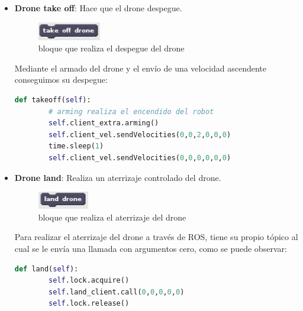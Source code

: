 \begin{itemize}
\begin{itemize}
\begin{lstlisting}[language=python,firstnumber=1]
\end{lstlisting}

	\item \textbf{Drone take off}: Hace que el drone despegue.\\
	\begin{figure}[H]
     		\centering
     		\includegraphics[scale=1.2]{img/block-takeoff.png}
     		\caption{bloque que realiza el despegue del drone}
  		\label{fig:listas}
  				\end{figure}
  				
Mediante el armado del drone y el envío de una velocidad ascendente conseguimos su despegue:\\

 \begin{lstlisting}[language=python,firstnumber=1]
    def takeoff(self):
    	# arming realiza el encendido del robot
        self.client_extra.arming()
        self.client_vel.sendVelocities(0,0,2,0,0,0)
        time.sleep(1)
        self.client_vel.sendVelocities(0,0,0,0,0,0)
\end{lstlisting}

	\item \textbf{Drone land}: Realiza un aterrizaje controlado del drone.\\
	\begin{figure}[H]
     		\centering
     		\includegraphics[scale=1.2]{img/block-land.png}
     		\caption{bloque que realiza el aterrizaje del drone}
  		\label{fig:listas}
  				\end{figure}
Para realizar el aterrizaje del drone a través de ROS, tiene su propio tópico al cual se le envía una llamada con argumentos cero, como se puede observar:\\

 \begin{lstlisting}[language=python,firstnumber=1]
    def land(self):
        self.lock.acquire()
        self.land_client.call(0,0,0,0,0)
        self.lock.release()
\end{lstlisting}
	


\end{itemize}
\end{itemize}
